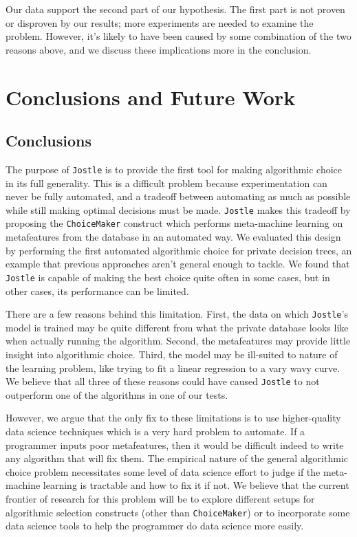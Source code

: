 \documentclass[11pt]{report}
\newcommand{\Jostle}{\texttt{Jostle}}
\renewcommand{\t}[1]{\texttt{#1}}
\begin{document}
Our data support the second part of our hypothesis. The first part is not proven or disproven by our results; more experiments are needed to examine the problem. However, it's likely to have been caused by some combination of the two reasons above, and we discuss these implications more in the conclusion.

\chapter{Conclusions and Future Work}\label{ch:future}
\section{Conclusions}
The purpose of \Jostle{} is to provide the first tool for making algorithmic choice in its full generality. This is a difficult problem because experimentation can never be fully automated, and a tradeoff between automating as much as possible while still making optimal decisions must be made. \Jostle{} makes this tradeoff by proposing the \t{ChoiceMaker} construct which performs meta-machine learning on metafeatures from the database in an automated way. We evaluated this design by performing the first automated algorithmic choice for private decision trees, an example that previous approaches aren't general enough to tackle.
We found that \Jostle{} is capable of making the best choice quite often in some cases, but in other cases, its performance can be limited.

There are a few reasons behind this limitation. First, the data on which \Jostle{}'s model is trained may be quite different from what the private database looks like when actually running the algorithm. Second, the metafeatures may provide little insight into algorithmic choice. Third, the model may be ill-suited to nature of the learning problem, like trying to fit a linear regression to a vary wavy curve. We believe that all three of these reasons could have caused \Jostle{} to not outperform one of the algorithms in one of our tests.

However, we argue that the only fix to these limitations is to use higher-quality data science techniques which is a very hard problem to automate. If a programmer inputs poor metafeatures, then it would be difficult indeed to write any algorithm that will fix them. The empirical nature of the general algorithmic choice problem necessitates some level of data science effort to judge if the meta-machine learning is tractable and how to fix it if not. We believe that the current frontier of research for this problem will be to explore different setups for algorithmic selection constructs (other than \t{ChoiceMaker}) or to incorporate some data science tools to help the programmer do data science more easily.
\end{document}
